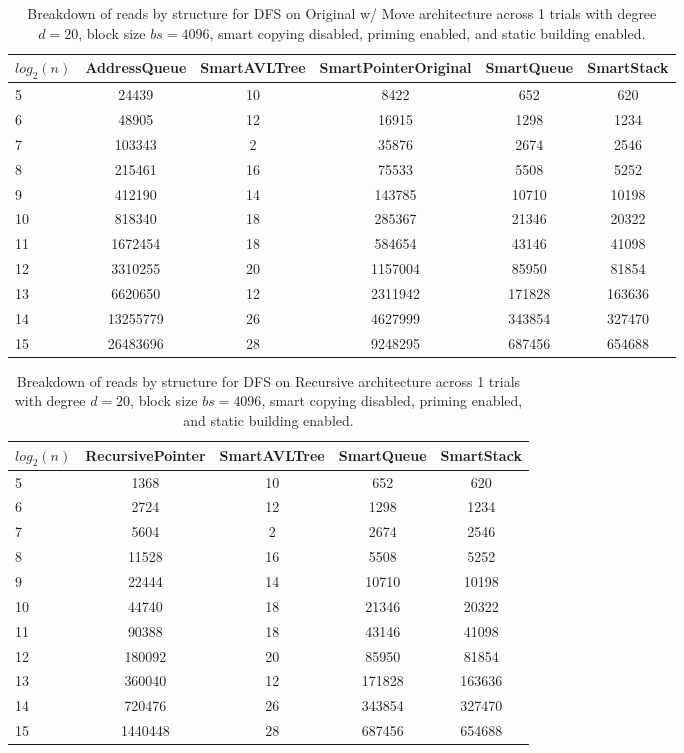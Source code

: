 \begin{table}[]
\centering
\begin{tabular}{|l|c|c|c|c|c|}
$log_2(n)$ & AddressQueue & SmartAVLTree & SmartPointerOriginal & SmartQueue & SmartStack \\ \hline
5 & 24439 & 10 & 8422 & 652 & 620 \\ \hline
6 & 48905 & 12 & 16915 & 1298 & 1234 \\ \hline
7 & 103343 & 2 & 35876 & 2674 & 2546 \\ \hline
8 & 215461 & 16 & 75533 & 5508 & 5252 \\ \hline
9 & 412190 & 14 & 143785 & 10710 & 10198 \\ \hline
10 & 818340 & 18 & 285367 & 21346 & 20322 \\ \hline
11 & 1672454 & 18 & 584654 & 43146 & 41098 \\ \hline
12 & 3310255 & 20 & 1157004 & 85950 & 81854 \\ \hline
13 & 6620650 & 12 & 2311942 & 171828 & 163636 \\ \hline
14 & 13255779 & 26 & 4627999 & 343854 & 327470 \\ \hline
15 & 26483696 & 28 & 9248295 & 687456 & 654688 \\ \hline
\end{tabular}
\caption{Breakdown of reads by structure for DFS on Original w/ Move architecture across 1 trials with degree $d=20$, block size $bs=4096$, smart copying disabled, priming enabled, and static building enabled.}
    \label{tab:reads_by_structure_dfs_d20_bs4096_trials1_copiesfalse_primetrue_staticinsertiontrue_ptoriginal_movetrue}
\end{table}

\begin{table}[]
\centering
\begin{tabular}{|l|c|c|c|c|}
$log_2(n)$ & RecursivePointer & SmartAVLTree & SmartQueue & SmartStack \\ \hline
5 & 1368 & 10 & 652 & 620 \\ \hline
6 & 2724 & 12 & 1298 & 1234 \\ \hline
7 & 5604 & 2 & 2674 & 2546 \\ \hline
8 & 11528 & 16 & 5508 & 5252 \\ \hline
9 & 22444 & 14 & 10710 & 10198 \\ \hline
10 & 44740 & 18 & 21346 & 20322 \\ \hline
11 & 90388 & 18 & 43146 & 41098 \\ \hline
12 & 180092 & 20 & 85950 & 81854 \\ \hline
13 & 360040 & 12 & 171828 & 163636 \\ \hline
14 & 720476 & 26 & 343854 & 327470 \\ \hline
15 & 1440448 & 28 & 687456 & 654688 \\ \hline
\end{tabular}
\caption{Breakdown of reads by structure for DFS on Recursive architecture across 1 trials with degree $d=20$, block size $bs=4096$, smart copying disabled, priming enabled, and static building enabled.}
    \label{tab:reads_by_structure_dfs_d20_bs4096_trials1_copiesfalse_primetrue_staticinsertiontrue_ptrecursive_movetrue}
\end{table}

